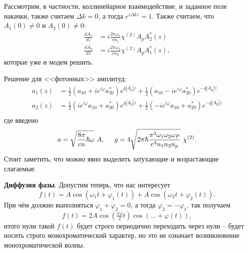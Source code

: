 



Рассмотрим, в частности, коллинейарное взаимодействие, и заданное поле накачки, также считаем $\Delta k = 0$, а тогда $e^{i \Delta k z} = 1$. Также считаем, что $A_1 (0) \neq 0$  и $A_2 (0) \neq 0$:
\begin{align*}
    \frac{d A_1}{d z} &= i \frac{2 \pi \omega_1}{c n_1} \chi^{(2)} A_p A_2^* (z) \\ 
    \frac{d A_2}{d z} &= i \frac{2 \pi \omega_2}{c n_2} \chi^{(2)} A_p A_1^* (z), 
\end{align*}
которые уже и модем решить. 

Решение для <<фотонных>> амплитуд:
\begin{equation*}
    \left.\begin{aligned}
        a_1 (z) &= \tfrac{1}{2} \left(a_{10} + i e^{i \varphi} a_{20}^*\right) e^{g |A_p| z} + \tfrac{1}{2} \left(a_{10} - i e^{i \varphi} a_{20}^*\right) e^{-g |A_p| z} \\
        a_2 (z) &= \tfrac{1}{2} \left(i e^{i \varphi} a_{10} +  a_{20}^*\right) e^{g |A_p| z} + \tfrac{1}{2} \left(- i e^{i \varphi} a_{10} + a_{20}^*\right) e^{-g |A_p| z} \\
    \end{aligned}\right.
\end{equation*}
где введено
\begin{equation*}
    a = \sqrt{\frac{8 \pi}{c n} \hbar \omega}\ A,
    \hspace{5 mm} 
    g = 4 \sqrt{2 \pi \hbar \frac{\pi^3 \omega_1 \omega_2 \omega_P}{c^3 n_1 n_2 n_p}}\ \chi^{(2)}.
\end{equation*}
Стоит заметить, что можно явно выделить затухающие и возрастающие слагаемые. 




\textbf{Диффузия фазы}. Допустим теперь, что нас интересует
\begin{equation*}
    f(t) = A \cos(\omega_1 t + \varphi_1 (t)) + A \cos(\omega_2 t + \varphi_2(t)).
\end{equation*}
При чём должно выполняться $\dot{\varphi}_1 + \dot{\varphi}_2 = 0$, а тогда $\varphi_2 = - \varphi_1$, так получаем
\begin{equation*}
    f(t) = 2 A \cos \left(\tfrac{\omega_P}{2}t\right) \cos \left(
        \ldots + \varphi(t)
    \right),
\end{equation*}
итого нули такой $f(t)$ будет строго периодично переходить через нули -- будет носить строго монохроматический характер, но это не означает возникновение монохроматической волны. 





